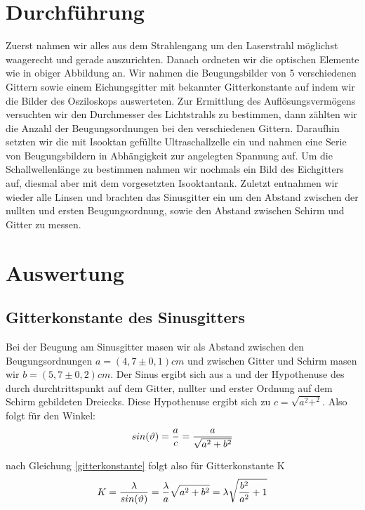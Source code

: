 \documentclass[12pt]{article}
\begin{document}
\section{Durchführung}
Zuerst nahmen wir alles aus dem Strahlengang um den Laserstrahl möglichst waagerecht und gerade auszurichten. Danach ordneten wir die optischen Elemente wie in obiger Abbildung an. Wir nahmen die Beugungsbilder von 5 verschiedenen Gittern sowie einem Eichungsgitter mit bekannter Gitterkonstante auf indem wir die Bilder des Osziloskops auswerteten. Zur Ermittlung des Auflösungsvermögens versuchten wir den Durchmesser des Lichtstrahls zu bestimmen, dann zählten wir die Anzahl der Beugungsordnungen bei den verschiedenen Gittern. Daraufhin setzten wir die mit Isooktan gefüllte Ultraschallzelle ein und nahmen eine Serie von Beugungsbildern in Abhängigkeit zur angelegten Spannung auf. Um die Schallwellenlänge zu bestimmen nahmen wir nochmals ein Bild des Eichgitters auf, diesmal aber mit dem vorgesetzten Isooktantank.  Zuletzt entnahmen wir wieder alle Linsen und brachten das Sinusgitter ein um den
Abstand zwischen der nullten und ersten Beugungsordnung, sowie den Abstand zwischen Schirm und Gitter zu messen.

\newpage

\section{Auswertung}
\subsection{Gitterkonstante des Sinusgitters}
Bei der Beugung am Sinusgitter masen wir als Abstand zwischen den Beugungsordnungen $a=(4,7 \pm 0,1)cm$ und zwischen Gitter und Schirm masen wir $b=(5,7\pm0,2)cm$. Der Sinus ergibt sich aus a und der Hypothenuse des durch durchtrittspunkt auf dem Gitter, nullter und erster Ordnung auf dem Schirm gebildeten Dreiecks. Diese Hypothenuse ergibt sich zu $c=\sqrt{a^2+^2}$. Also folgt für den Winkel:
\begin{align}
\notag
 sin(\vartheta)=\frac{a}{c}=\frac{a}{\sqrt{a^2+b^2}}
\end{align}

nach Gleichung \ref{gitterkonstante} folgt also für Gitterkonstante K
\begin{align}
\notag
 K=\frac{\lambda}{sin(\vartheta)}=\frac{\lambda}{a}\sqrt{a^2+b^2}= \lambda\sqrt{\frac{b^2}{a^2}+1}
\end{align}
\end{document}
